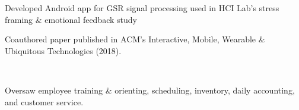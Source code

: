\documentclass[]{hieudo-build}
\begin{document}
\begin{minipage}[t]{0.63\textwidth}
\begin{tightemize}
\item Developed Android app for GSR signal processing used in HCI Lab's stress framing \& emotional feedback study \\
\smallskip
{}
\item Coauthored paper published in ACM's
Interactive, Mobile, Wearable \& Ubiquitous Technologies (2018). \\
\end{tightemize}

\sectionsep


 \\
\begin{tightemize}
\item Oversaw employee training \& orienting, scheduling, inventory, daily accounting, and customer service.
\end{tightemize}
\sectionsep

%
%
\end{minipage} 
\hfill
\end{document}
